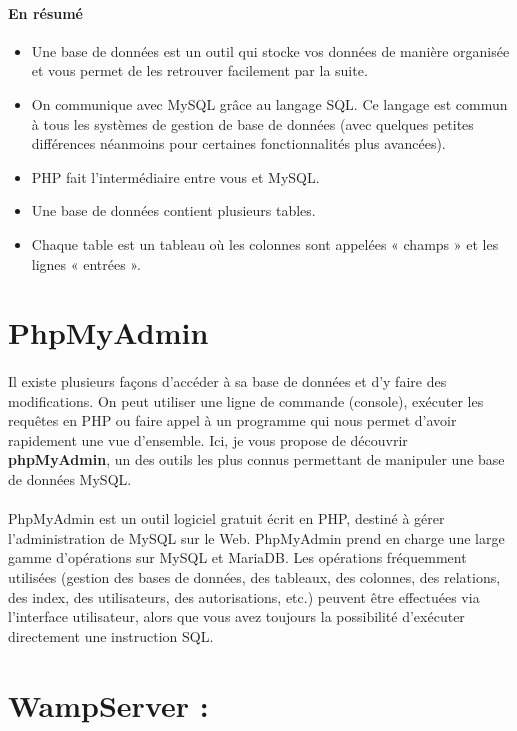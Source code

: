 \paragraph{En résumé}
\begin{itemize}
	\item Une base de données est un outil qui stocke vos données de manière organisée et vous permet de les retrouver facilement par la suite.
	\item On communique avec MySQL grâce au langage SQL. Ce langage est commun à tous les systèmes de gestion de base de données (avec quelques petites différences néanmoins pour certaines fonctionnalités plus avancées).
	\item PHP fait l'intermédiaire entre vous et MySQL.
	\item Une base de données contient plusieurs tables.
	\item Chaque table est un tableau où les colonnes sont appelées « champs » et les lignes « entrées ».
\end{itemize}

\section{PhpMyAdmin}
\paragraph{}
Il existe plusieurs façons d'accéder à sa base de données et d'y faire des modifications. On peut utiliser une ligne de commande (console), exécuter les requêtes en PHP ou faire appel à un programme qui nous permet d'avoir rapidement une vue d'ensemble. Ici, je vous propose de découvrir \textbf{phpMyAdmin}, un des outils les plus connus permettant de manipuler une base de données MySQL.

\paragraph{}

PhpMyAdmin est un outil logiciel gratuit écrit en PHP, destiné à gérer l'administration de MySQL sur le Web. PhpMyAdmin prend en charge une large gamme d'opérations sur MySQL et MariaDB. Les opérations fréquemment utilisées (gestion des bases de données, des tableaux, des colonnes, des relations, des index, des utilisateurs, des autorisations, etc.) peuvent être effectuées via l'interface utilisateur, alors que vous avez toujours la possibilité d'exécuter directement une instruction SQL.
\section{\textbf{WampServer :}}
